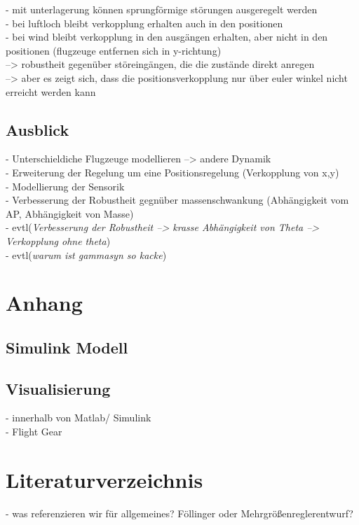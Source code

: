 - mit unterlagerung können sprungförmige störungen ausgeregelt werden \\
- bei luftloch bleibt verkopplung erhalten auch in den positionen \\
- bei wind bleibt verkopplung in den ausgängen erhalten, aber nicht in den positionen (flugzeuge entfernen sich in y-richtung)\\
--> robustheit gegenüber störeingängen, die die zustände direkt anregen \\
--> aber es zeigt sich, dass die positionsverkopplung nur über euler winkel nicht erreicht werden kann

\subsection{Ausblick}
- Unterschieldiche Flugzeuge modellieren --> andere Dynamik\\
- Erweiterung der Regelung um eine Positionsregelung (Verkopplung von x,y)\\
- Modellierung der Sensorik\\
- Verbesserung der Robustheit gegnüber massenschwankung (Abhängigkeit vom AP, Abhängigkeit von Masse)\\
- evtl(\textit{Verbesserung der Robustheit --> krasse Abhängigkeit von Theta --> Verkopplung ohne theta})\\
- evtl(\textit{warum ist gammasyn so kacke})
\section{Anhang}
\subsection{Simulink Modell}
\subsection{Visualisierung}
- innerhalb von Matlab/ Simulink\\
- Flight Gear \\
\section{Literaturverzeichnis}
- was referenzieren wir für allgemeines? Föllinger oder Mehrgrößenreglerentwurf?

